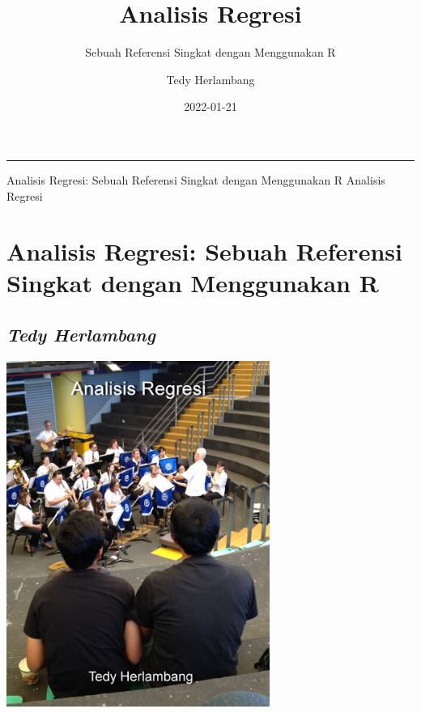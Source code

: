 \documentclass[
]{book}
\title{Analisis Regresi}
\subtitle{Sebuah Referensi Singkat dengan Menggunakan R}
\author{Tedy Herlambang}
\date{2022-01-21}
\begin{document}
\maketitle

{
\setcounter{tocdepth}{1}
\tableofcontents
}
\begin{center}\rule{0.5\linewidth}{0.5pt}\end{center}

Analisis Regresi: Sebuah Referensi Singkat dengan Menggunakan R \textbar{} Analisis Regresi

\hypertarget{analisis-regresi-sebuah-referensi-singkat-dengan-menggunakan-r}{%
\chapter*{Analisis Regresi: Sebuah Referensi Singkat dengan Menggunakan R}\label{analisis-regresi-sebuah-referensi-singkat-dengan-menggunakan-r}}

\hypertarget{tedy-herlambang}{%
\section*{\texorpdfstring{\emph{Tedy Herlambang}}{Tedy Herlambang}}\label{tedy-herlambang}}

\includegraphics[width=3.38542in,height=\textheight]{images/analisisregresi.jpg}
\end{document}
